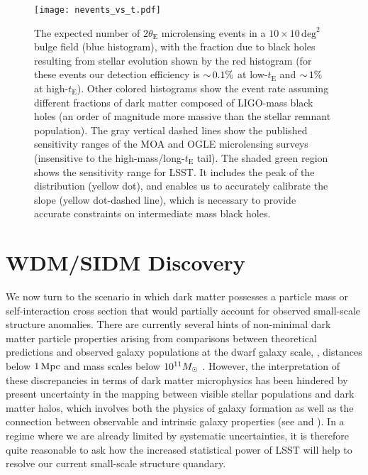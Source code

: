 \begin{figure}[t]
\centering
\texttt{[image: nevents\_vs\_t.pdf]}
\caption{\label{fig:macho_discovery}
  The expected number of $2\theta_\mathrm{E}$ microlensing events in a $10\times10\,\mathrm{deg}^2$ bulge field (blue histogram), with the fraction due to black holes resulting from stellar evolution shown by the red histogram (for these events our detection efficiency is $ {\sim}\, 0.1\%$ at low-$t_\mathrm{E}$ and $ {\sim}\, 1\%$ at high-$t_\mathrm{E}$).
  Other colored histograms show the event rate assuming different fractions of dark matter composed of LIGO-mass black holes (an order of magnitude more massive than the stellar remnant population).
  The gray vertical dashed lines show the published sensitivity ranges of the MOA and OGLE microlensing surveys (insensitive to the high-mass/long-$t_\mathrm{E}$ tail).
  The shaded green region shows the sensitivity range for LSST.
  It includes the peak of the distribution (yellow dot), and enables us to accurately calibrate the slope (yellow dot-dashed line), which is necessary to provide accurate constraints on intermediate mass black holes.  
}
\end{figure}

\section{WDM/SIDM Discovery}
\label{sec:wdm_sidm_discovery}

We now turn to the scenario in which dark matter possesses a particle mass or self-interaction cross section that would partially account for observed small-scale structure anomalies.
There are currently several hints of non-minimal dark matter particle properties arising from comparisons between theoretical predictions and observed galaxy populations at the dwarf galaxy scale, \ie, distances below $1 \mathrm{\,Mpc}$ and mass scales below $10^{11} M_\odot$ \citep[reviewed by][]{BuckleyPeter:2017,Bullock:2017xww}.
However, the interpretation of these discrepancies in terms of dark matter microphysics has been hindered by present uncertainty in the mapping between visible stellar populations and dark matter halos, which involves both the physics of galaxy formation as well as the connection between observable and intrinsic galaxy properties (see  and ).
In a regime where we are already limited by systematic uncertainties, it is therefore quite reasonable to ask how the increased statistical power of LSST will help to resolve our current small-scale structure quandary.

